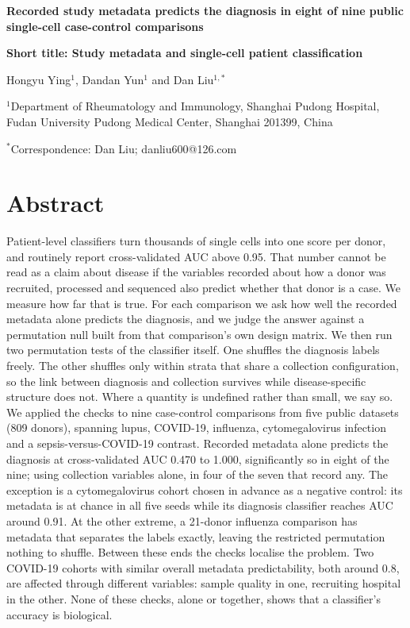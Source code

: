 \begin{center}
{\LARGE\bfseries Recorded study metadata predicts the diagnosis in eight of nine public single-cell case-control comparisons\par}
\vspace{0.75em}
{\small\bfseries Short title: Study metadata and single-cell patient classification\par}
\vspace{1em}
{\normalsize Hongyu Ying$^{1}$, Dandan Yun$^{1}$ and Dan Liu$^{1,*}$\par}
\vspace{0.4em}
{\small $^{1}$Department of Rheumatology and Immunology, Shanghai Pudong Hospital, Fudan University Pudong Medical Center, Shanghai 201399, China\par}
{\small $^{*}$Correspondence: Dan Liu; danliu600@126.com\par}
\end{center}
\vspace{1em}

\section{Abstract}\label{abstract}

Patient-level classifiers turn thousands of single cells into one score per donor, and routinely report cross-validated AUC above 0.95. That number cannot be read as a claim about disease if the variables recorded about how a donor was recruited, processed and sequenced also predict whether that donor is a case. We measure how far that is true. For each comparison we ask how well the recorded metadata alone predicts the diagnosis, and we judge the answer against a permutation null built from that comparison's own design matrix. We then run two permutation tests of the classifier itself. One shuffles the diagnosis labels freely. The other shuffles only within strata that share a collection configuration, so the link between diagnosis and collection survives while disease-specific structure does not. Where a quantity is undefined rather than small, we say so. We applied the checks to nine case-control comparisons from five public datasets (809 donors), spanning lupus, COVID-19, influenza, cytomegalovirus infection and a sepsis-versus-COVID-19 contrast. Recorded metadata alone predicts the diagnosis at cross-validated AUC 0.470 to 1.000, significantly so in eight of the nine; using collection variables alone, in four of the seven that record any. The exception is a cytomegalovirus cohort chosen in advance as a negative control: its metadata is at chance in all five seeds while its diagnosis classifier reaches AUC around 0.91. At the other extreme, a 21-donor influenza comparison has metadata that separates the labels exactly, leaving the restricted permutation nothing to shuffle. Between these ends the checks localise the problem. Two COVID-19 cohorts with similar overall metadata predictability, both around 0.8, are affected through different variables: sample quality in one, recruiting hospital in the other. None of these checks, alone or together, shows that a classifier's accuracy is biological.

